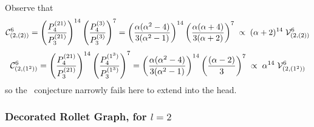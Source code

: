 Observe that
\[
{\mathcal C}^{6}_{(2,(2))} = 
\left( \frac{ P^{(21)}_{4}}{P^{(21)}_{3}} \right)^{14} 
\left( \frac{ P^{(3)}_{4}}{P^{(3)}_{3}} \right)^{7} 
=  \left( \frac{\alpha(\alpha^2 -4)}{3(\alpha^2 -1)}  \right)^{14} 
\left( \frac{\alpha (\alpha+4)}{3(\alpha+2)}  \right)^{7} 
\;\propto \; (\alpha+2)^{14} \; {\mathcal V}^6_{(2,(2))}
\]
\[
{\mathcal C}^{6}_{(2,(1^2))} =
\left( \frac{ P^{(21)}_{4}}{P^{(21)}_{3}} \right)^{14} 
\left( \frac{ P^{(1^3)}_{4}}{P^{(1^3)}_{3}} \right)^{7} 
=  \left( \frac{\alpha(\alpha^2 -4)}{3(\alpha^2 -1)}  \right)^{14} 
\left( \frac{ (\alpha-2)}{3}  \right)^{7} 
\;\propto  \; \alpha^{14} \; {\mathcal V}^6_{(2,(1^2))}
\]
so the \ournotmain\ conjecture narrowly fails here to extend into the head.



\subsubsection{Decorated Rollet Graph, for $l=2$}   \label{ss:gdetl2}

